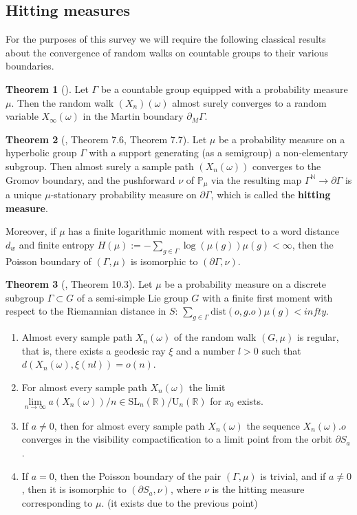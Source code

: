 \documentclass[11pt]{amsart}
\theoremstyle{definition}
\newtheorem{theorem}{Theorem}[section]
\begin{document}
		\subsection{Hitting measures}
		For the purposes of this survey we will require the following classical results about the convergence of random walks on countable groups to their various boundaries.
		\begin{theorem}[\cite{woess_2000}]
			\label{general convergence to Martin}
			Let $\Gamma$ be a countable group equipped with a probability measure $\mu$. Then the random walk $(X_n)(\omega)$ almost surely converges to a random variable $X_\infty(\omega)$ in the Martin boundary $\partial_M \Gamma$.
		\end{theorem}
		\begin{theorem}[\cite{kaimanovich2000poisson}, Theorem 7.6, Theorem 7.7]
			\label{hyperbolic convergence to Gromov}
			Let $\mu$ be a probability measure on a hyperbolic group $\Gamma$ with a support generating (as a semigroup) a non-elementary subgroup. Then almost surely a sample path $(X_n(\omega))$ converges to the Gromov boundary, and the pushforward $\nu$ of $\mathbb{P}_\mu$ via the resulting map $\Gamma^\mathbb{N} \rightarrow \partial \Gamma$ is a unique $\mu$-stationary probability measure on $\partial \Gamma$, which is called the \textbf{hitting measure}. 
			
			Moreover, if $\mu$ has a finite logarithmic moment with respect to a word distance $d_w$ and finite entropy $H(\mu) := - \sum_{g \in \Gamma} \log(\mu(g)) \mu(g) < \infty$, then the Poisson boundary of $(\Gamma, \mu)$ is isomorphic to $(\partial \Gamma, \nu)$.
		\end{theorem}
		\begin{theorem}[\cite{kaimanovich2000poisson}, Theorem 10.3]
			\label{higher-rank convergence to Furstenberg}
			Let $\mu$ be a probability measure on a discrete subgroup $\Gamma \subset G$ of a semi-simple Lie group $G$ with a finite first moment with respect to the Riemannian distance in $S$: $\sum_{g \in \Gamma} \text{dist}(o, g.o) \mu(g) < infty$. 
			\begin{enumerate}
				\item Almost every sample path $X_n(\omega)$ of the random walk $(G, \mu)$ is regular, that is, there exists a geodesic ray $\xi$ and a number $l > 0$ such that $d(X_n(\omega), \xi(nl)) = o(n)$. 
				\item For almost every sample path $X_n(\omega)$ the limit $\lim\limits_{n \rightarrow \infty} a(X_n(\omega))/n \in \text{SL}_n(\mathbb{R}) / \text{U}_n(\mathbb{R})$ for $x_0$ exists.
				\item If $a \ne 0$, then for almost every sample path $X_n(\omega)$ the sequence $X_n(\omega).o$ converges in the visibility compactification to a limit point from the orbit $\partial S_a$.
				\item If $a = 0$, then the Poisson boundary of the pair $(\Gamma, \mu)$ is trivial, and if $a \ne 0$, then it is isomorphic to $(\partial S_a, \nu)$, where $\nu$ is the hitting measure corresponding to $\mu$. (it exists due to the previous point)
			\end{enumerate} 
		\end{theorem}
\end{document}
